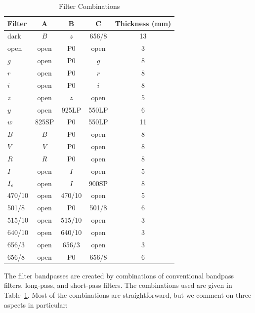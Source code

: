 \begin{table}
\begin{center}
\caption{Filter Combinations}
\label{table:huitzi-f20-filter-combinations}
\medskip
\begin{tabular}{lcccc}
\hline
Filter&A&B&C&Thickness (mm)\\
\hline
dark		&$B$		&$z$		&656/8	&\phantom{}13		\\
open		&open		&P0		&open		&\phantom{0}3		\\
$g$		&open		&P0		&$g$		&\phantom{0}8		\\
$r$		&open		&P0		&$r$		&\phantom{0}8		\\
$i$			&open		&P0		&$i$		&\phantom{0}8		\\
$z$		&open		&$z$		&open		&\phantom{0}5		\\
$y$		&open		&925LP	&550LP	&\phantom{0}6		\\
$w$		&825SP	&P0		&550LP	&\phantom{}11		\\
$B$		&$B$		&P0		&open		&\phantom{0}8		\\
$V$		&$V$		&P0		&open		&\phantom{0}8		\\
$R$		&$R$		&P0		&open		&\phantom{0}8		\\
$I$		&open		&$I$		&open		&\phantom{0}5		\\
$\mbox{$I_\mathrm{s}$}$		&open		&$I$		&900SP	&\phantom{0}8		\\
470/10	&open		&470/10	&open		&\phantom{0}5		\\
501/8		&open		&P0		&501/8	&\phantom{0}6		\\
515/10	&open		&515/10	&open		&\phantom{0}3		\\
640/10	&open		&640/10	&open		&\phantom{0}3		\\
656/3		&open		&656/3	&open		&\phantom{0}3		\\
656/8		&open		&P0		&656/8	&\phantom{0}6		\\
\hline
\end{tabular}
\end{center}
\end{table}

The filter bandpasses are created by combinations of conventional bandpass filters, long-pass, and short-pass filters. The combinations used are given in Table~\ref{table:huitzi-f20-filter-combinations}. Most of the combinations are straightforward, but we comment on three aspects in particular:

